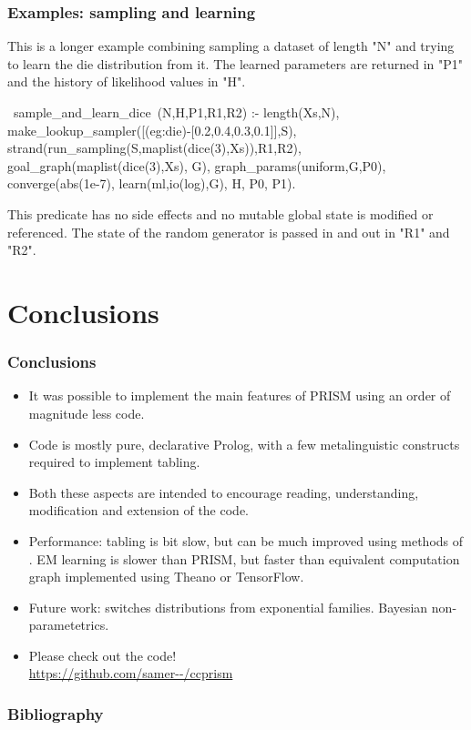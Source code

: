 \documentclass[usenames,dvipsnames]{beamer}
\newenvironment{bframe}[1][untitled]{\begin{frame}[allowframebreaks]\frametitle{#1}}{\end{frame}}
\newenvironment{iframe}[1][untitled]{\begin{frame}\frametitle{#1}}{\end{frame}}
\newenvironment{isframe}[1][untitled]{\begin{frame}[fragile=singleslide,environment=isframe]\frametitle{#1}}{\end{frame}}
\begin{document}
\begin{isframe}[Examples: sampling and learning]
This is a longer example combining sampling a dataset of
length "N" and trying to learn the die distribution from it.
The learned parameters are returned in "P1" and the history
of likelihood values in "H".
\begin{prolog}[xleftmargin=0em,basicstyle=\small]
  ~sample_and_learn_dice~(N,H,P1,R1,R2) :-
    length(Xs,N),
    make_lookup_sampler([(eg:die)-[0.2,0.4,0.3,0.1]],S),
    strand(run_sampling(S,maplist(dice(3),Xs)),R1,R2),
    goal_graph(maplist(dice(3),Xs), G),
    graph_params(uniform,G,P0),
    converge(abs(1e-7), learn(ml,io(log),G), H, P0, P1).
\end{prolog}
This predicate has no side effects and no mutable
global state is modified or referenced. The state of the
random generator is passed in and out in "R1" and "R2".
\end{isframe}

\section{Conclusions}
	\begin{iframe}[Conclusions]
    \begin{itemize}
      \item<+->It was possible to implement the main features of PRISM using an order of magnitude less code.

      \item<+->Code is mostly pure, declarative Prolog, with a few metalinguistic constructs required to implement tabling.

      \item<+->Both these aspects are intended to encourage reading, understanding, modification and extension of the code.

      \item<+->Performance: tabling is bit slow, but can be much improved using methods of \citet{Abdallah2017b}. EM learning
        is slower than PRISM, but faster than equivalent computation graph implemented using Theano or TensorFlow.

      \item<+->Future work: switches distributions from exponential families. Bayesian non-parametetrics.

      \item<+->Please check out the code!\\\url{https://github.com/samer--/ccprism}
\end{itemize}
\end{iframe}

	\begin{bframe}[Bibliography]
    \printbibliography
	\end{bframe}
\end{document}
